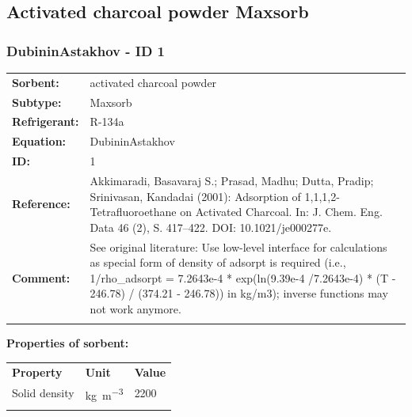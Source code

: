 \subsection{Activated charcoal powder Maxsorb}
%
\subsubsection{DubininAstakhov - ID 1}
%
\begin{tabular}[l]{|lp{11.5cm}|}
\hline
\addlinespace

\textbf{Sorbent:} & activated charcoal powder \\
\textbf{Subtype:} & Maxsorb \\
\textbf{Refrigerant:} & R-134a \\
\textbf{Equation:} & DubininAstakhov \\
\textbf{ID:} & 1 \\
\textbf{Reference:} & Akkimaradi, Basavaraj S.; Prasad, Madhu; Dutta, Pradip; Srinivasan, Kandadai (2001): Adsorption of 1,1,1,2-Tetrafluoroethane on Activated Charcoal. In: J. Chem. Eng. Data 46 (2), S. 417–422. DOI: 10.1021/je000277e. \\
\textbf{Comment:} & See original literature: Use low-level interface for calculations as special form of density of adsorpt is required (i.e., 1/rho\_adsorpt = 7.2643e-4 * exp(ln(9.39e-4 /7.2643e-4) * (T - 246.78) / (374.21 - 246.78)) in kg/m3); inverse functions may not work anymore. \\

\addlinespace
\hline
\end{tabular}
\newline

\textbf{Properties of sorbent:}
\newline
%
\begin{longtable}[l]{lll}
\toprule
\addlinespace
\textbf{Property} & \textbf{Unit} & \textbf{Value} \\
\addlinespace
\midrule
\endhead
\bottomrule
\endfoot
\bottomrule
\endlastfoot
\addlinespace

Solid density & \si{\kilogram\per\cubic\meter} & 2200\\

\addlinespace\end{longtable}

